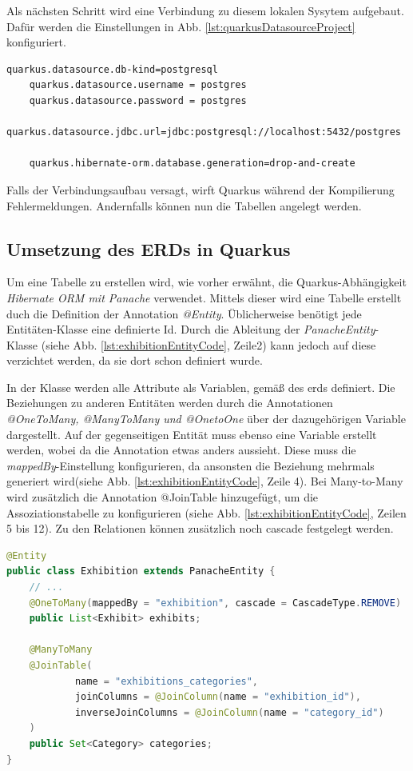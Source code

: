 Als nächsten Schritt wird eine Verbindung zu diesem lokalen Sysytem aufgebaut. 
Dafür werden die Einstellungen in Abb. \ref{lst:quarkusDatasourceProject} konfiguriert.

\begin{lstlisting}[label=lst:quarkusDatasourceProject]
    quarkus.datasource.db-kind=postgresql
    quarkus.datasource.username = postgres
    quarkus.datasource.password = postgres
    quarkus.datasource.jdbc.url=jdbc:postgresql://localhost:5432/postgres

    quarkus.hibernate-orm.database.generation=drop-and-create
\end{lstlisting}

Falls der Verbindungsaufbau versagt, wirft Quarkus während der Kompilierung Fehlermeldungen. 
Andernfalls können nun die Tabellen angelegt werden. 

\subsection{Umsetzung des ERDs in Quarkus}
Um eine Tabelle zu erstellen wird, wie vorher erwähnt, die Quarkus-Abhängigkeit \emph{Hibernate ORM mit Panache} verwendet.
Mittels dieser wird eine Tabelle erstellt duch die Definition der Annotation \emph{@Entity}.
Üblicherweise benötigt jede Entitäten-Klasse eine definierte Id.
Durch die Ableitung der \emph{PanacheEntity}-Klasse (siehe Abb. \ref{lst:exhibitionEntityCode}, Zeile2) kann jedoch auf diese verzichtet werden, da sie dort schon definiert wurde.

In der Klasse werden alle Attribute als Variablen, gemäß des \gls*{erd}s definiert. 
Die Beziehungen zu anderen Entitäten werden durch die Annotationen \emph{@OneToMany, @ManyToMany und @OnetoOne} über der dazugehörigen Variable dargestellt. 
Auf der gegenseitigen Entität muss ebenso eine Variable erstellt werden, wobei da die Annotation etwas anders aussieht. 
Diese muss die \emph{mappedBy}-Einstellung konfigurieren, da ansonsten die Beziehung mehrmals generiert wird(siehe Abb. \ref{lst:exhibitionEntityCode}, Zeile 4). 
Bei Many-to-Many wird zusätzlich die Annotation @JoinTable hinzugefügt, um die Assoziationstabelle zu konfigurieren (siehe Abb. \ref{lst:exhibitionEntityCode}, Zeilen 5 bis 12). 
Zu den Relationen können zusätzlich noch \gls{cascade} festgelegt werden. 

\begin{lstlisting}[label=lst:exhibitionEntityCode, language=java]
@Entity
public class Exhibition extends PanacheEntity {
    // ...
    @OneToMany(mappedBy = "exhibition", cascade = CascadeType.REMOVE)
    public List<Exhibit> exhibits;

    @ManyToMany
    @JoinTable(
            name = "exhibitions_categories",
            joinColumns = @JoinColumn(name = "exhibition_id"),
            inverseJoinColumns = @JoinColumn(name = "category_id")
    )
    public Set<Category> categories;
}
\end{lstlisting}

